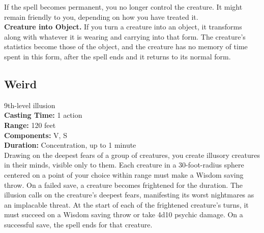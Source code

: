 \documentclass[11pt, A4paper, english]{article}
\begin{document}
If the spell becomes permanent, you no longer control the creature. It might remain friendly to you, depending on how you have treated it. \\
\textbf{Creature into Object.} If you turn a creature into an object, it transforms along with whatever it is wearing and carrying into that form. The creature’s statistics become those of the object, and the creature has no memory of time spent in this form, after the spell ends and it returns to its normal form.

		\subsection{Weird}
9th-level illusion \\
\textbf{Casting Time:} 1 action \\
\textbf{Range:} 120 feet \\
\textbf{Components:} V, S \\
\textbf{Duration:} Concentration, up to 1 minute \\
Drawing on the deepest fears of a group of creatures, you create illusory creatures in their minds, visible only to them. Each creature in a 30-foot-radius sphere centered on a point of your choice within range must make a Wisdom saving throw. On a failed save, a creature becomes frightened for the duration. The illusion calls on the creature’s deepest fears, manifesting its worst nightmares as an implacable threat. At the start of each of the frightened creature’s turns, it must succeed on a Wisdom saving throw or take 4d10 psychic damage. On a successful save, the spell ends for that creature.
\end{document}
